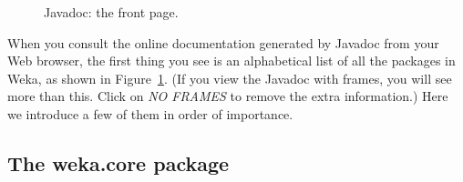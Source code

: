\begin{figure}[!thp]
\caption{\label{fig:javadoc_a}Javadoc: the front page.}
\end{figure}


When you consult the online documentation generated by Javadoc from
your Web browser, the first thing you see is an alphabetical list of
all the packages in Weka, as shown in Figure~\ref{fig:javadoc_a}. (If
you view the Javadoc with frames, you will see more than this. Click
on \textit{NO FRAMES} to remove the extra information.) Here we
introduce a few of them in order of importance.

\subsection{The weka.core package}

